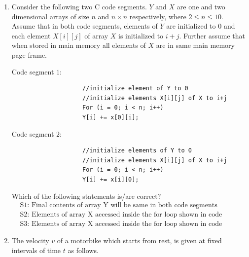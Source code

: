 \documentclass[journal,12pt,onecolumn]{IEEEtran}
\theoremstyle{remark}
\begin{document}
\begin{enumerate}
				\item Consider the following two C code segments. $Y$ and $X$ are one and two dimensional arrays of size $n$ and $n \times n$ respectively, where $2 \leq n \leq 10$. Assume that in both code segments, elements of $Y$ are initialized to $0$ and each element $X[i][j]$ of array $X$ is initialized to $i + j$. Further assume that when stored in main memory all elements of $X$ are in same main memory page frame.
				
				Code segment $1$:
				\begin{verbatim}
					//initialize element of Y to 0
					//initialize elements X[i][j] of X to i+j
					For (i = 0; i < n; i++)
					Y[i] += x[0][i];
				\end{verbatim}
				
				Code segment $2$:
				\begin{verbatim}
					//initialize elements of Y to 0
					//initialize elements X[i][j] of X to i+j
					For (i = 0; i < n; i++)
					Y[i] += x[i][0];
				\end{verbatim}
				
				Which of the following statements is/are correct?
				\begin{align*}
					&\text{S1: Final contents of array Y will be same in both code segments}\\
					&\text{S2: Elements of array X accessed inside the for loop shown in code segment 1 are contiguous in main memory}\\
					&\text{S3: Elements of array X accessed inside the for loop shown in code segment 2 are contiguous in main memory.}
				\end{align*}
				
				\hfill{}
				
				\begin{enumerate}
				\end{enumerate}
				
				\item The velocity $v$  of a motorbike which starts from rest, is given at fixed intervals of time $t$  as follows.
				

\end{enumerate}
\end{document}
